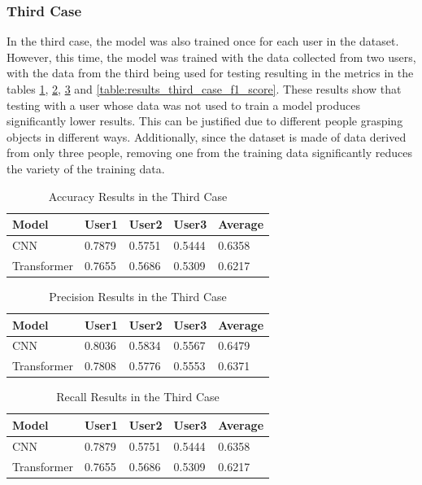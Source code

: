 \subsubsection{Third Case}

In the third case, the model was also trained once for each user in the dataset. However, this time, the model was trained with the data collected from two users, with the data from the third being used for testing resulting in the metrics in the tables \ref{table:results_third_case_acc}, \ref{table:results_third_case_precision}, \ref{table:results_third_case_recall} and \ref{table:results_third_case_f1_score}. These results show that testing with a user whose data was not used to train a model produces significantly lower results. This can be justified due to different people grasping objects in different ways. Additionally, since the dataset is made of data derived from only three people, removing one from the training data significantly reduces the variety of the training data.

\begin{table}[H]
    \centering
    \caption{Accuracy Results in the Third Case}
    \label{table:results_third_case_acc}
    \begin{tabular}{|l|l|l|l|l|}
        \hline
        Model & User1 & User2 & User3 & Average \\
        \hline
        CNN & 0.7879 & 0.5751 & 0.5444 & 0.6358 \\
        \hline
        Transformer & 0.7655 & 0.5686 & 0.5309 & 0.6217 \\
        \hline
    \end{tabular}
\end{table}

\begin{table}[H]
    \centering
    \caption{Precision Results in the Third Case}
    \label{table:results_third_case_precision}
    \begin{tabular}{|l|l|l|l|l|}
        \hline
        Model & User1 & User2 & User3 & Average \\
        \hline
        CNN & 0.8036 & 0.5834 & 0.5567 & 0.6479 \\
        \hline
        Transformer & 0.7808 & 0.5776 & 0.5553 & 0.6371 \\
        \hline
    \end{tabular}
\end{table}

\begin{table}[H]
    \centering
    \caption{Recall Results in the Third Case}
    \label{table:results_third_case_recall}
    \begin{tabular}{|l|l|l|l|l|}
        \hline
        Model & User1 & User2 & User3 & Average \\
        \hline
        CNN & 0.7879 & 0.5751 & 0.5444 & 0.6358 \\
        \hline
        Transformer & 0.7655 & 0.5686 & 0.5309 & 0.6217 \\
        \hline
    \end{tabular}
\end{table}

